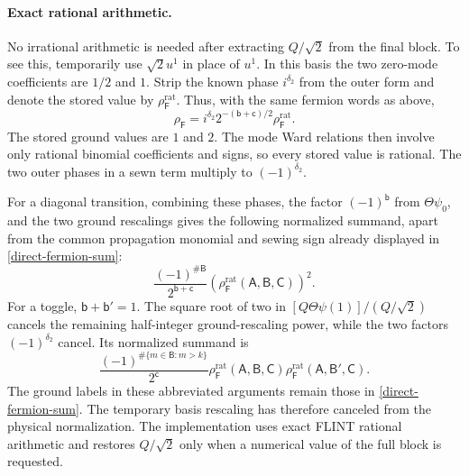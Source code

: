 \paragraph{Exact rational arithmetic.}
No irrational arithmetic is needed after extracting $Q/\sqrt2$ from
the final block.  To see this, temporarily use $\sqrt2u^1$ in place
of $u^1$.  In this basis the two zero-mode coefficients are $1/2$
and $1$.  Strip the known phase $i^{\delta_2}$ from the outer form
and denote the stored value by $\rho_{\mathsf F}^{\mathrm{rat}}$.
Thus, with the same fermion words as above,
\begin{equation}
 \rho_{\mathsf F}
 =i^{\delta_2}2^{-(\mathsf b+\mathsf c)/2}
   \rho_{\mathsf F}^{\mathrm{rat}}.
\end{equation}
The stored ground values are $1$ and $2$.  The mode Ward relations
then involve only rational binomial coefficients and signs, so every
stored value is rational.  The two outer phases in a sewn term
multiply to $(-1)^{\delta_2}$.

For a diagonal transition, combining these phases, the factor
$(-1)^{\mathsf b}$ from $\Theta\psi_0$, and the two ground rescalings
gives the following normalized summand, apart from the common
propagation monomial and sewing sign already displayed in
\eqref{direct-fermion-sum}:
\begin{equation}
 \frac{(-1)^{\#\mathsf B}}{2^{\mathsf b+\mathsf c}}
  \left(\rho_{\mathsf F}^{\mathrm{rat}}
   (\mathsf A,\mathsf B,\mathsf C)\right)^2.
\end{equation}
For a toggle, $\mathsf b+\mathsf b'=1$.  The square root of two in
$[Q\Theta\psi(1)]/(Q/\sqrt2)$ cancels the remaining half-integer
ground-rescaling power, while the two factors
$(-1)^{\delta_2}$ cancel.  Its normalized summand is
\begin{equation}
 \frac{(-1)^{\#\{m\in\mathsf B:m>k\}}}{2^{\mathsf c}}
 \rho_{\mathsf F}^{\mathrm{rat}}(\mathsf A,\mathsf B,\mathsf C)
 \rho_{\mathsf F}^{\mathrm{rat}}(\mathsf A,\mathsf B',\mathsf C).
\end{equation}
The ground labels in these abbreviated arguments remain those in
\eqref{direct-fermion-sum}.  The temporary basis rescaling has
therefore canceled from the physical normalization.  The implementation
uses exact FLINT rational arithmetic and restores $Q/\sqrt2$ only
when a numerical value of the full block is requested.

